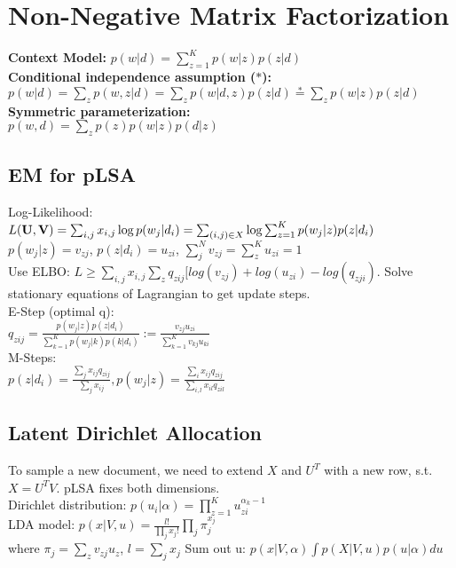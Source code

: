 \section{Non-Negative Matrix Factorization}
\textbf{Context Model:} $p(w | d) = \sum_{z=1}^K p(w | z) p(z | d)$\\
\textbf{Conditional independence assumption ($*$):}\\
$p(w|d) = \sum_z p(w,z|d) = \sum_z p(w|d,z)p(z|d) \stackrel{*}{=} \sum_z p(w|z)p(z|d)$\\
\textbf{Symmetric parameterization:}\\
$p(w, d) = \sum_z p(z)p(w | z) p(d | z)$

\subsection*{EM for pLSA}
Log-Likelihood: $L(\mathbf{U}, \mathbf{V}) = \sum_{i,j} x_{i,j}\log p(w_j|d_i) \\
= \sum_{(i,j) \in X} \log \sum_{z=1}^K p(w_j|z)p(z|d_i)$ \\ 
$ p(w_j|z) = v_{zj}$, $p(z|d_i) = u_{zi}$, $\sum_j^N v_{zj} = \sum_z^K u_{zi} = 1$\\
Use ELBO: $L \geq \sum_{i,j}x_{i,j}\sum_z q_{zij}[log(v_{zj}) + log(u_{zi}) - log(q_{zji})$. Solve stationary equations of Lagrangian to get update steps.\\
E-Step (optimal q):\\
$q_{zij} = \frac{p(w_j|z)p(z|d_i)}{\sum_{k=1}^K p(w_j|k)p(k|d_i)} := \frac{v_{zj}u_{zi}}{\sum_{k=1}^K v_{kj}u_{ki}}$\\
M-Steps:\\
$p(z|d_i) = \frac{\sum_j x_{ij}q_{zij}}{\sum_j x_{ij}}, p(w_j|z) = \frac{\sum_i x_{ij}q_{zij}}{\sum_{i,l}x_{il}q_{zil}}$\\

\subsection*{Latent Dirichlet Allocation}
To sample a new document, we need to extend $X$ and $U^T$ with a new row, s.t. $X=U^T V$. pLSA fixes both dimensions.\\
Dirichlet distribution: $p(u_i|\alpha) = \prod_{z=1}^K u_{zi}^{\alpha_k-1}$\\
LDA model: $p(x|V,u) = \frac{l!}{\prod_j x_j!}\prod_j \pi_j^{x_j}$\\
where $\pi_j=\sum_z v_{zj} u_z$, $l=\sum_j x_j$
Sum out u: $p(x|V, \alpha) \int p(X|V,u)p(u|\alpha)du$

